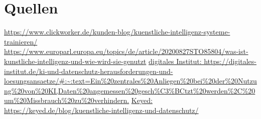 \documentclass{report}
\begin{document}
\section{Quellen}
\url {https://www.clickworker.de/kunden-blog/kuenstliche-intelligenz-systeme-trainieren/}
\url {https://www.europarl.europa.eu/topics/de/article/20200827STO85804/was-ist-kunstliche-intelligenz-und-wie-wird-sie-genutzt}
\url{digitales Institut: https://digitales-institut.de/ki-und-datenschutz-herausforderungen-und-loesungsansaetze/#:~:text=Ein%20zentrales%20Anliegen%20bei%20der%20Nutzung%20von%20KI,Daten%20angemessen%20gesch%C3%BCtzt%20werden%2C%20um%20Missbrauch%20zu%20verhindern.}
\url {Keyed: https://keyed.de/blog/kuenstliche-intelligenz-und-datenschutz/}


\nocite{*}
\printbibliography
\end{document}
